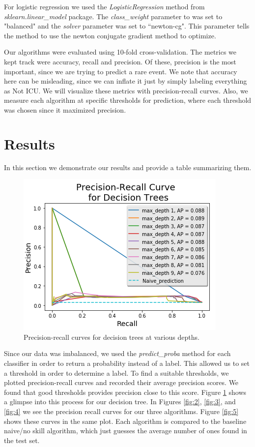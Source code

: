 \documentclass{article}
\begin{document}
For logistic regression we used the \emph{LogisticRegression} method from \emph{sklearn.linear\_model} package. The \emph{class\_weight} parameter to was set to "balanced" and the \emph{solver} parameter was set to ``newton-cg". This parameter tells the method to use the newton conjugate gradient method to optimize.    

Our algorithms were evaluated using 10-fold cross-validation. The metrics we kept track were accuracy, recall and precision. Of these, precision is the most important, since we are trying to predict a rare event. We note that accuracy here can be misleading, since we can inflate it just by simply labeling everything as Not ICU. We will visualize these metrics with precision-recall curves. Also, we measure each algorithm at specific thresholds for prediction, where each threshold was chosen since it maximized precision.  


\section{Results}
In this section we demonstrate our results and provide a table summarizing them. 

\begin{figure}[h]
\centering
\includegraphics[scale=.9]{DT_Depth_PR_curves}
\caption{Precision-recall curves for decision trees at various depths. }
\label{fig:1}
\end{figure}

Since our data was imbalanced, we used the \emph{predict\_proba} method for each classifier in order to return a probability instead of a label. This allowed us to set a threshold in order to determine a label. To find a suitable thresholds, we plotted precision-recall curves  and recorded their average precision scores. We found that good thresholds provides precision close to this score. Figure \ref{fig:1} shows a glimpse into this process for our decision tree. In Figures \ref{fig:2}, \ref{fig:3}, and \ref{fig:4} we see the precision recall curves for our three algorithms. Figure \ref{fig:5} shows these curves in the same plot. Each algorithm is compared to the baseline naive/no skill algorithm, which just guesses the average number of ones found in the test set.    
\end{document}
